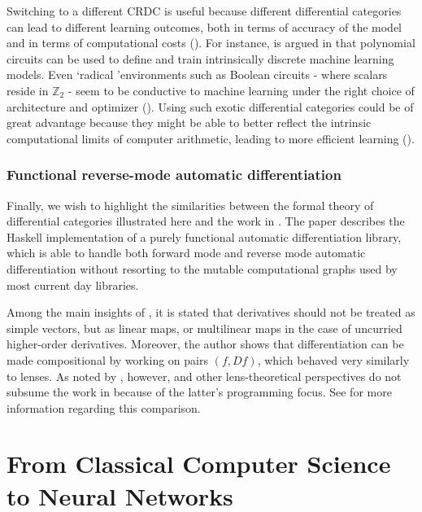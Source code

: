 \documentclass[11pt,a4paper,openright,twoside]{report}
\theoremstyle{plain}
\theoremstyle{definition}
\begin{document}
Switching to a different CRDC is useful because different differential categories can lead to different learning outcomes, both in terms of accuracy of the model and in terms of computational costs (\cite{wilson2022categories}).
For instance, is argued in \cite{wilson2022categories} that polynomial circuits can be used to define and train intrinsically discrete machine learning models. Even \lq radical \rq environments such as Boolean circuits - where scalars reside in $\mathbb{Z}_2$ - seem to be conductive to machine learning under the right choice of architecture and optimizer (\cite{wilson2021reverse}). Using such exotic differential categories could be of great advantage because they might be able to better reflect the intrinsic computational limits of computer arithmetic, leading to more efficient learning (\cite{wilson2022categories}). 

\subsection{Functional reverse-mode automatic differentiation}

Finally, we wish to highlight the similarities between the formal theory of differential categories illustrated here and the work in \cite{elliott2018simple}. The paper describes the Haskell implementation of a purely functional automatic differentiation library, which is able to handle both forward mode and reverse mode automatic differentiation without resorting to the mutable computational graphs used by most current day libraries. 

Among the main insights of \cite{elliott2018simple}, it is stated that derivatives should not be treated as simple vectors, but as linear maps, or multilinear maps in the case of uncurried higher-order derivatives. Moreover, the author shows that differentiation can be made compositional by working on pairs $(f, Df)$, which behaved very similarly to lenses. As noted by \cite{shiebler2021category}, however, \cite{cruttwell2022categorical} and other lens-theoretical perspectives do not subsume the work in \cite{elliott2018simple} because of the latter's programming focus. See \cite{shiebler2021category} for more information regarding this comparison.

\clearpage{\pagestyle{empty}\cleardoublepage}


\chapter{From Classical Computer Science to Neural Networks}
\lhead[\fancyplain{}{\bfseries\thepage}]{\fancyplain{}{\bfseries\rightmark}}
\end{document}
